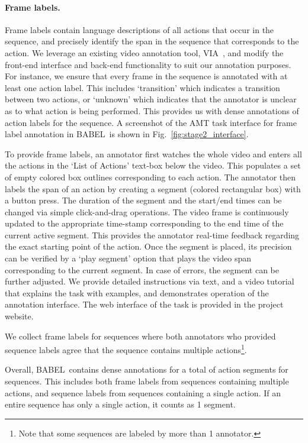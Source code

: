 \documentclass[final]{cvpr}
\def\babel{BABEL}
\begin{document}
\noindent
\paragraph{Frame labels.}
\label{sec:stage_2_interface}
Frame labels contain language descriptions of all actions that occur in the sequence, and precisely identify the span in the sequence that corresponds to the action. 
We leverage an existing video annotation tool, VIA~\cite{dutta2019vgg}, and modify the front-end interface and back-end functionality to suit our annotation purposes. 
For instance, we ensure that every frame in the sequence is annotated with at least one action label. This includes `transition' which indicates a transition between two actions, or `unknown' which indicates that the annotator is unclear as to what action is being performed. 
This provides us with dense annotations of action labels for the sequence. 
A screenshot of the AMT task interface for frame label annotation in \babel~is shown in Fig.~\ref{fig:stage2_interface}. 

To provide frame labels, an annotator first watches the whole video and enters all the actions in the `List of Actions' text-box below the video. 
This populates a set of empty colored box outlines corresponding to each action. 
The annotator then labels the span of an action by creating a segment (colored rectangular box) with a button press. 
The duration of the segment and the start/end times can be changed via simple click-and-drag operations. 
The video frame is continuously updated to the appropriate time-stamp corresponding to the end time of the current active segment. This provides the annotator real-time feedback regarding the exact starting point of the action. 
Once the segment is placed, its precision can be verified by a `play segment' option that plays the video span corresponding to the current segment. In case of errors, the segment can be further adjusted. 
We provide detailed instructions via text, and a video tutorial that explains the task with examples, and demonstrates operation of the annotation interface. 
The web interface of the task is provided in the project website. 

We collect frame labels for  sequences where both annotators who provided sequence labels agree that the sequence contains multiple actions\footnote{Note that some sequences are labeled by more than 1 annotator.}.

Overall, \babel~contains dense annotations for a total of  action segments for  sequences. This includes both frame labels from sequences containing multiple actions, and sequence labels from sequences containing a single action. If an entire sequence has only a single action, it counts as 1 segment. 
\end{document}
